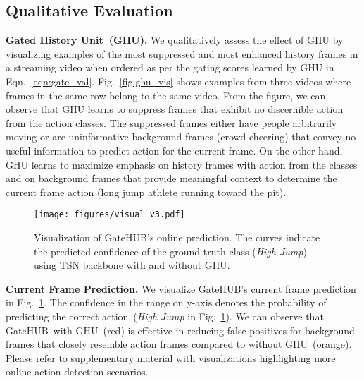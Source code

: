 \documentclass[10pt,twocolumn,letterpaper]{article}
\newcommand{\methodname}{GateHUB}
\begin{document}
\subsection{Qualitative Evaluation}
{\noindent \bf Gated History Unit~(GHU).} We qualitatively assess the effect of GHU by visualizing examples of the most suppressed and most enhanced history frames in a streaming video when ordered as per the gating scores  learned by GHU in Eqn.~\ref{eqn:gate_val}. Fig.~\ref{fig:ghu_vis} shows examples from three videos where frames in the same row belong to the same video. From the figure, we can observe that GHU learns to suppress frames that exhibit no discernible action from the  action classes. The suppressed frames either have people arbitrarily moving or are uninformative background frames (\eg crowd cheering) that convey no useful information to predict action for the current frame. On the other hand, GHU learns to maximize emphasis on history frames with action from the  classes and on background frames that provide meaningful context to determine the current frame action (\eg long jump athlete running toward the pit).
\begin{figure}[t]
\begin{center}
    \texttt{[image: figures/visual\_v3.pdf]}
\end{center}
\vspace{-2em}
  \caption{Visualization of \methodname's online prediction. The curves indicate the predicted confidence of the ground-truth class (\textit{High Jump}) using TSN backbone with and without GHU.
}
  \vspace{-1.5em}
\label{fig:oad_vis}
\end{figure}

{\noindent \bf Current Frame Prediction.} We visualize \methodname's current frame prediction in Fig.~\ref{fig:oad_vis}. The confidence in the range  on y-axis denotes the probability of predicting the correct action~(\ie \textit{High Jump} in Fig.~\ref{fig:oad_vis}).
We can observe that \methodname~with GHU~(red) is effective in 
reducing false positives for background frames that closely resemble action frames compared to without GHU~(orange). 
Please refer to supplementary material with visualizations highlighting more online action detection scenarios.
\end{document}
